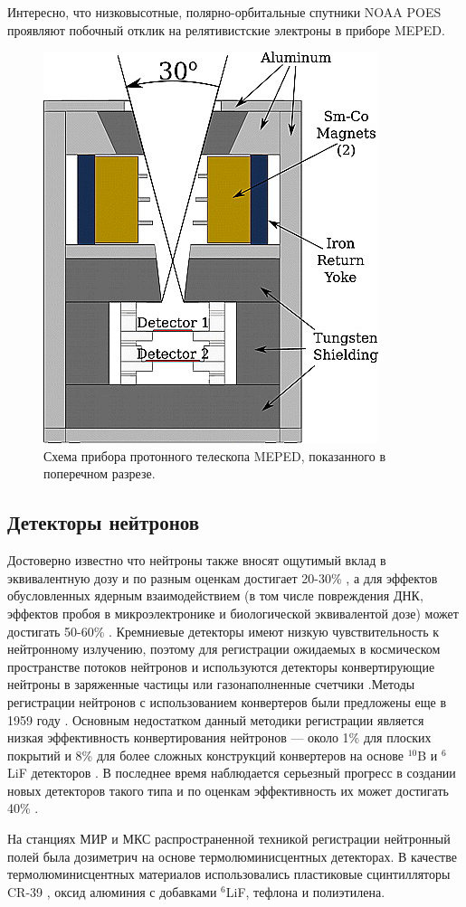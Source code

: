 Интересно, что низковысотные, полярно-орбитальные спутники NOAA POES проявляют побочный отклик на релятивистские электроны в приборе MEPED\cite{Yando2011}.
\begin{figure}
	\centering
	\includegraphics[width=0.3\linewidth]{images/jgra21383-fig-0002}
	\caption{Схема прибора протонного телескопа MEPED, показанного в поперечном разрезе.\cite{Yando2011}}
	\label{fig:jgra21383-fig-0002}
\end{figure}


\subsection{Детекторы нейтронов} \label{subsect1_3_1}


Достоверно известно что нейтроны также вносят ощутимый вклад в эквивалентную дозу и по разным оценкам достигает 20-30\% \cite{Dudkin1990}, а для эффектов обусловленных ядерным взаимодействием (в том числе повреждения ДНК, эффектов пробоя в микроэлектронике и биологической эквивалентой дозе) может достигать 50-60\% \cite{Armstrong2001} \cite{Benton2001}. Кремниевые детекторы имеют низкую чувствительность к нейтронному излучению, поэтому для регистрации ожидаемых в космическом пространстве потоков нейтронов \cite{Esteban2016} и используются детекторы конвертирующие нейтроны в заряженные частицы или газонаполненные счетчики \cite{Stozhkov2007}.Методы регистрации нейтронов с использованием конвертеров были предложены еще в 1959 году \cite{McGregor2013}. Основным недостатком данный методики регистрации является низкая эффективность конвертирования нейтронов --- около 1\% для плоских покрытий и 8\% для более сложных конструкций конвертеров на основе $ ^{10} $B и $ ^6 $LiF детекторов \cite{Mendicino2015}. В последнее время наблюдается серьезный прогресс в создании новых детекторов такого типа и по оценкам эффективность их может достигать 40\% \cite{McGregor2013}. 

На станциях МИР и МКС распространенной техникой регистрации нейтронный полей была дозиметрич на основе термолюминисцентных детекторах. В качестве термолюминисцентных материалов использовались пластиковые сцинтилляторы CR-39 \cite{Alberts1991}, оксид алюминия с добавками $ ^6 $LiF, тефлона и полиэтилена\cite{Kulkarni2011}.

